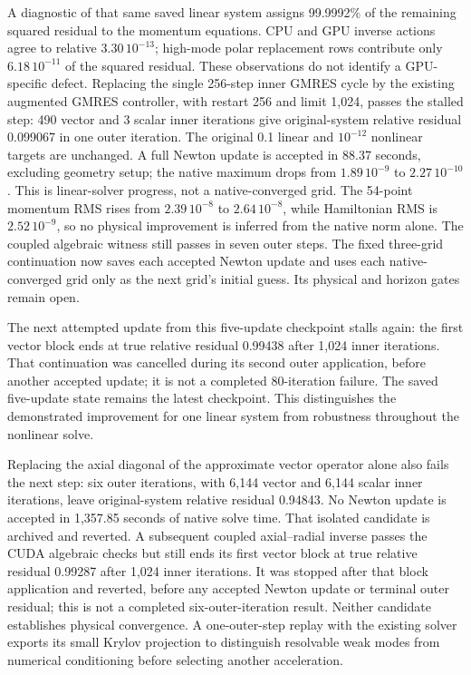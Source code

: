 \documentclass[aps,prd,preprint,notitlepage,nofootinbib]{revtex4-2}
\begin{document}
A diagnostic of that same saved linear system assigns 99.9992\% of the
remaining squared residual to the momentum equations. CPU and GPU inverse
actions agree to relative $3.30\,10^{-13}$; high-mode polar replacement rows
contribute only $6.18\,10^{-11}$ of the squared residual. These observations
do not identify a GPU-specific defect. Replacing the single 256-step inner
GMRES cycle by the existing augmented GMRES controller, with restart 256
and limit 1,024, passes the stalled step: 490 vector and 3 scalar inner
iterations give original-system relative residual 0.099067 in one outer
iteration. The original 0.1 linear and $10^{-12}$ nonlinear targets are
unchanged. A full Newton update is accepted in 88.37 seconds, excluding
geometry setup; the native maximum drops from $1.89\,10^{-9}$ to
$2.27\,10^{-10}$. This is linear-solver progress, not a native-converged grid.
The 54-point momentum RMS rises from $2.39\,10^{-8}$ to $2.64\,10^{-8}$,
while Hamiltonian RMS is $2.52\,10^{-9}$, so no physical improvement is
inferred from the native norm alone. The coupled algebraic witness still
passes in seven outer steps. The fixed three-grid continuation now saves
each accepted Newton update and uses each native-converged grid only as
the next grid's initial guess. Its physical and horizon gates remain open.

The next attempted update from this five-update checkpoint stalls again:
the first vector block ends at true relative residual 0.99438 after 1,024
inner iterations. That continuation was cancelled during its second
outer application, before another accepted update; it is not a completed
80-iteration failure. The saved five-update state remains the latest
checkpoint. This distinguishes the demonstrated improvement for one
linear system from robustness throughout the nonlinear solve.

Replacing the axial diagonal of the approximate vector operator alone
also fails the next step: six outer iterations, with 6,144 vector and
6,144 scalar inner iterations, leave original-system relative residual
0.94843. No Newton update is accepted in 1,357.85 seconds of native solve
time. That isolated candidate is archived and reverted. A subsequent
coupled axial--radial inverse passes the CUDA algebraic checks but still
ends its first vector block at true relative residual 0.99287 after 1,024
inner iterations. It was stopped after that block application and reverted,
before any accepted Newton update or terminal outer residual; this is
not a completed six-outer-iteration result. Neither candidate establishes
physical convergence. A one-outer-step replay with the existing solver
exports its small Krylov projection to distinguish resolvable weak modes
from numerical conditioning before selecting another acceleration.
\end{document}
